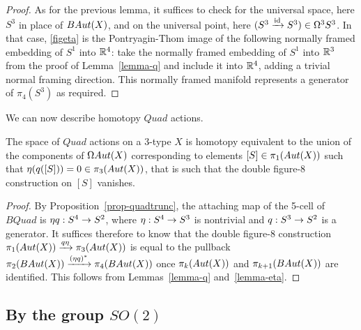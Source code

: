 \documentclass{amsart}
\begin{document}
\begin{proof}
As for the previous lemma, it suffices to check for the universal space, here $S^3$ in place of $BAut(X)$, and on the universal point, here $(S^3 \xrightarrow{\mathrm{id}} S^3) \in \Omega^3 S^3$.  In that case, \cref{figeta} is the Pontryagin-Thom image of the following normally framed embedding of $S^1$ into $\mathbb R^4$: take the normally framed embedding of $S^1$ into $\mathbb R^3$ from the proof of Lemma~\ref{lemma-q} and include it into $\mathbb R^4$, adding a trivial normal framing direction.  This normally framed manifold represents a generator of $\pi_4(S^3)$ as required.
\end{proof}

We can now describe homotopy $Quad$ actions.

\begin{proposition} 
\label{prop-quadaction}
The space of $Quad$ actions on a 3-type $X$ is homotopy equivalent to the union of the components of $\Omega Aut(X)$ corresponding to elements $[S] \in \pi_1(Aut(X))$ such that $\eta(q([S])) = 0 \in \pi_3(Aut(X))$, that is such that the double figure-8 construction on $[S]$ vanishes.
\end{proposition}
\begin{proof}
By Proposition~\ref{prop-quadtrunc}, the attaching map of the 5-cell of $BQuad$ is $\eta q: S^4 \rightarrow S^2$, where $\eta : S^4 \rightarrow S^3$ is nontrivial and $q: S^3 \rightarrow S^2$ is a generator.  It suffices therefore to know that the double figure-8 construction $\pi_1(Aut(X)) \xrightarrow{q \eta} \pi_3(Aut(X))$ is equal to the pullback $\pi_2(BAut(X)) \xrightarrow{(\eta q)^\ast} \pi_4(BAut(X))$ once $\pi_{k}(Aut(X))$ and $\pi_{k+1}(BAut(X))$ are identified.  This follows from Lemmas~\ref{lemma-q} and~\ref{lemma-eta}.
\end{proof}



\subsection{By the group $SO(2)$}
\end{document}

